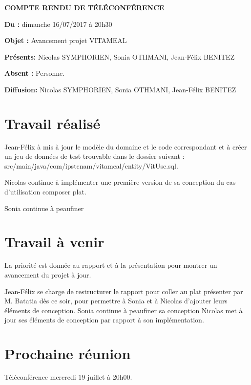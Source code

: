 \documentclass[11pt,a4paper,french,twoside,openright]{article}
\begin{document}
\pagestyle{fancy}

\begin{center}\bfseries\Huge
COMPTE RENDU DE TÉLÉCONFÉRENCE
\end{center}

\textbf{Du      :} dimanche 16/07/2017 à 20h30

\textbf{Objet   :} Avancement projet VITAMEAL

\textbf{Présents:} Nicolas SYMPHORIEN, Sonia OTHMANI, Jean-Félix BENITEZ

\textbf{Absent :} Personne.

\textbf{Diffusion:} Nicolas SYMPHORIEN, Sonia OTHMANI, Jean-Félix BENITEZ

\hrulefill

\section{Travail réalisé}

Jean-Félix à mis à jour le modèle du domaine et le code correspondant et à créer un jeu de données de test trouvable dans le dossier suivant : src/main/java/com/ipstcnam/vitameal/entity/VitUse.sql.

Nicolas continue à implémenter une première version de sa conception du cas d'utilisation composer plat.

Sonia continue à peaufiner 

\section{Travail à venir}

La priorité est donnée au rapport et à la présentation pour montrer un avancement du projet à jour.

Jean-Félix se charge de restructurer le rapport pour coller au plat présenter par M. Batatia dès ce soir, pour permettre à Sonia et à Nicolas d'ajouter leurs éléments de conception.
Sonia continue à peaufiner sa conception
Nicolas met à jour ses éléments de conception par rapport à son implémentation.

\section{Prochaine réunion}
Téléconférence mercredi 19  juillet à 20h00.

\label{LastPage}
\end{document}
